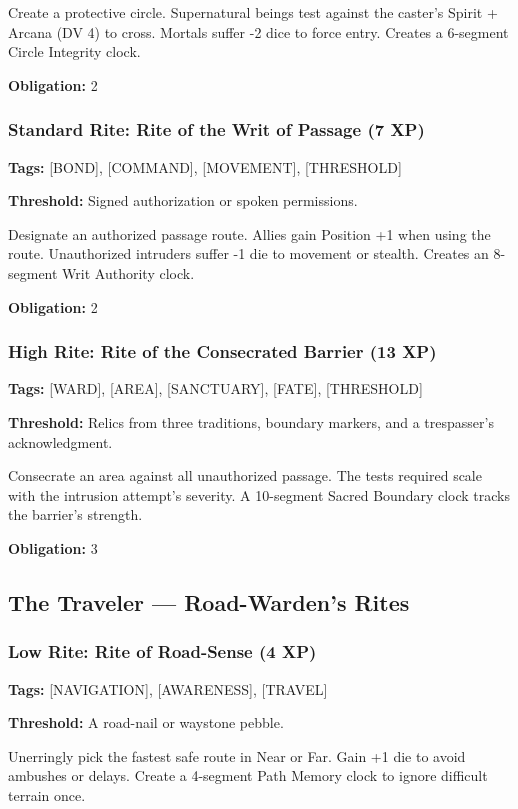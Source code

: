 Create a protective circle. Supernatural beings test against the caster's Spirit + Arcana (DV 4) to cross. Mortals suffer -2 dice to force entry. Creates a 6-segment Circle Integrity clock.

\textbf{Obligation:} 2

\subsubsection{Standard Rite: Rite of the Writ of Passage (7 XP)}

\textbf{Tags:} [BOND], [COMMAND], [MOVEMENT], [THRESHOLD]

\textbf{Threshold:} Signed authorization or spoken permissions.

Designate an authorized passage route. Allies gain Position +1 when using the route. Unauthorized intruders suffer -1 die to movement or stealth. Creates an 8-segment Writ Authority clock.

\textbf{Obligation:} 2

\subsubsection{High Rite: Rite of the Consecrated Barrier (13 XP)}

\textbf{Tags:} [WARD], [AREA], [SANCTUARY], [FATE], [THRESHOLD]

\textbf{Threshold:} Relics from three traditions, boundary markers, and a trespasser's acknowledgment.

Consecrate an area against all unauthorized passage. The tests required scale with the intrusion attempt's severity. A 10-segment Sacred Boundary clock tracks the barrier's strength.

\textbf{Obligation:} 3

\subsection{The Traveler — Road-Warden's Rites}

\subsubsection{Low Rite: Rite of Road-Sense (4 XP)}

\textbf{Tags:} [NAVIGATION], [AWARENESS], [TRAVEL]

\textbf{Threshold:} A road-nail or waystone pebble.

Unerringly pick the fastest safe route in Near or Far. Gain +1 die to avoid ambushes or delays. Create a 4-segment Path Memory clock to ignore difficult terrain once.

